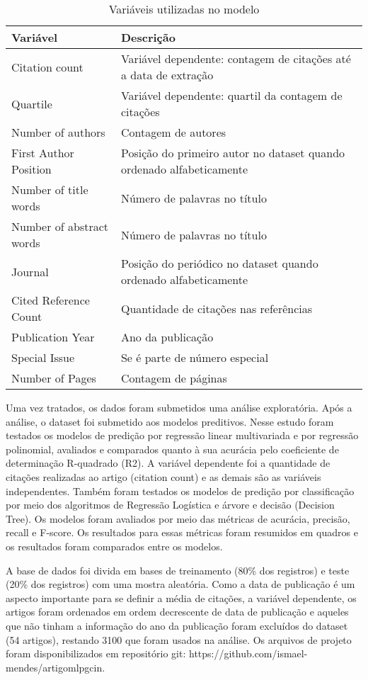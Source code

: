 \documentclass[runningheads]{llncs}
\begin{document}
\begin{table}[]
    \centering
    \caption{Variáveis utilizadas no modelo}
    \label{tabvar}
    \begin{tabular}{|l|p{8cm}|}
         \hline
         Variável & Descrição\\
         \hline
         Citation count & Variável dependente: contagem de citações até a data de extração\\
         Quartile & Variável dependente: quartil da contagem de citações\\
         Number of authors & Contagem de autores\\
         First Author Position & Posição do primeiro autor no dataset quando ordenado alfabeticamente\\
         Number of title words & Número de palavras no título\\
         Number of abstract words & Número de palavras no título\\
         Journal & Posição do periódico no dataset quando ordenado alfabeticamente\\
         Cited Reference Count & Quantidade de citações nas referências\\
         Publication Year & Ano da publicação\\
         Special Issue & Se é parte de número especial\\
         Number of Pages & Contagem de páginas\\
         \hline
    \end{tabular}
\end{table}

Uma vez tratados, os dados foram submetidos uma análise exploratória. Após a análise, o dataset foi submetido aos modelos preditivos. Nesse estudo foram testados os modelos de predição por regressão linear multivariada e por regressão polinomial, avaliados e comparados quanto à sua acurácia pelo coeficiente de determinação R-quadrado (R2). A variável dependente foi a quantidade de citações realizadas ao artigo (citation count) e as demais são as variáveis independentes. Também foram testados os modelos de predição por classificação por meio dos algoritmos de Regressão Logística e árvore e decisão (Decision Tree). Os modelos foram avaliados por meio das métricas de acurácia, precisão, recall e F-score. Os resultados para essas métricas foram resumidos em quadros e os resultados foram comparados entre os modelos.

A base de dados foi divida em bases de treinamento (80\% dos registros) e teste (20\% dos registros) com uma mostra aleatória. Como a data de publicação é um aspecto importante para se definir a média de citações, a variável dependente, os artigos foram ordenados em ordem decrescente de data de publicação e aqueles que não tinham a informação do ano da publicação foram excluídos do dataset (54 artigos), restando 3100 que foram usados na análise. Os arquivos de projeto foram disponibilizados em repositório git: https://github.com/ismael-mendes/artigomlpgcin.
\end{document}
